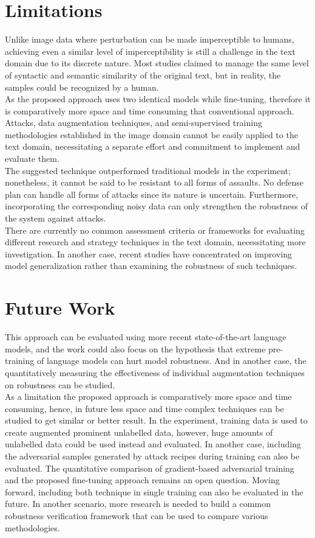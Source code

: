 \documentclass[%
	BCOR=8mm, %
	DIV=12,
	toc=bibliography, %
	toc=listof, %
	oneside, %
	egregdoesnotlikesansseriftitles, %
	]{scrbook}
\begin{document}
\section{Limitations}
\label{section:limitations}
Unlike image data where perturbation can be made imperceptible to humans, achieving even a similar level of imperceptibility is still a challenge in the text domain due to its discrete nature. Most studies claimed to manage the same level of syntactic and semantic similarity of the original text, but in reality, the samples could be recognized by a human.\\
As the proposed approach uses two identical models while fine-tuning, therefore it is comparatively more space and time consuming  that conventional approach. \\
Attacks, data augmentation techniques, and semi-supervised training methodologies established in the image domain cannot be easily applied to the text domain, necessitating a separate effort and commitment to implement and evaluate them.\\
The suggested technique outperformed traditional models in the experiment; nonetheless, it cannot be said to be resistant to all forms of assaults. No defense plan can handle all forms of attacks since its nature is uncertain. Furthermore, incorporating the corresponding noisy data can only strengthen the robustness of the system against attacks.\\
There are currently no common assessment criteria or frameworks for evaluating different research and strategy techniques in the text domain, necessitating more investigation. In another case, recent studies have concentrated on improving model generalization rather than examining the robustness of such techniques.


\section{Future Work }
\label{section:futurework}
This approach can be evaluated using more recent state-of-the-art language models, and the work could also focus on the hypothesis that extreme pre-training of language models can hurt model robustness. And in another case, the quantitatively measuring the effectiveness of individual augmentation techniques on robustness can be studied.\\
As a limitation the proposed approach is comparatively more space and time consuming, hence, in future less space and time complex techniques can be studied to get similar or better result. 
In the experiment, training data is used to create augmented prominent unlabelled data, however,  huge amounts of unlabelled data could be used instead and evaluated. In another case, including the adversarial samples generated by attack recipes during training can also be evaluated. The quantitative comparison of gradient-based adversarial training and the proposed fine-tuning approach remains an open question. Moving forward, including both technique in single training can also be evaluated in the future. In another scenario, more research is needed to build a common robustness verification framework that can be used to compare various methodologies.
 
\end{document}
